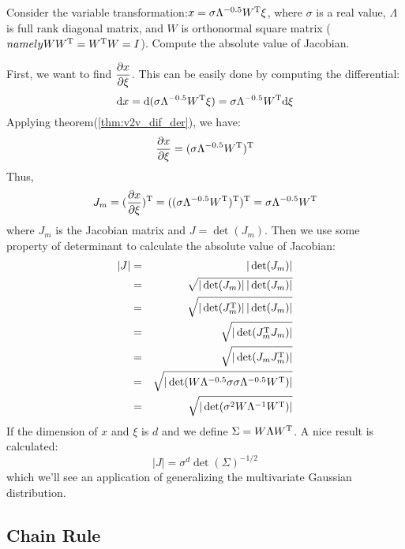 \begin{myex}
	\label{ex:gaussian_trans}
	Consider the variable transformation:$x = \sigma \Lambda^{-0.5}W^\mathrm{T} \xi$, 
	where $\sigma$ is a real value, $\Lambda$ is full rank diagonal matrix, 
	and $W$ is orthonormal square matrix
	($namely WW^\mathrm{T}=W^\mathrm{T}W = I$). Compute
	the absolute value of Jacobian.  
	
	First, we want to find $\dfrac{\partial x}{\partial \xi}$. This can be easily done 
	by computing the differential:
	\begin{equation}
		\mathrm{d}x = \mathrm{d}(\sigma \Lambda^{-0.5}W^\mathrm{T} \xi) 
		= \sigma \Lambda^{-0.5}W^\mathrm{T} \mathrm{d}\xi
	\end{equation}
	Applying theorem(\ref{thm:v2v_dif_der}), we have:
	\begin{equation}
		\dfrac{\partial x}{\partial \xi} = (\sigma \Lambda^{-0.5}W^\mathrm{T}) ^\mathrm{T}
	\end{equation}
	Thus, 
	\begin{equation}
		J_m = (\dfrac{\partial x}{\partial \xi}) ^\mathrm{T} = ((\sigma \Lambda^{-0.5}W^\mathrm{T}) ^\mathrm{T})^\mathrm{T}
		=\sigma \Lambda^{-0.5}W^\mathrm{T}
	\end{equation}
	where $J_m$ is the Jacobian matrix and $J= \det(J_m)$. Then we use 
	some property of determinant to calculate the absolute value of 
	Jacobian:
	\begin{eqnarray}
		|J| &=& |\det(J_m)| \\
		&=& \sqrt{|\det(J_m)|\,|\det(J_m)|} \\
		&=& \sqrt{|\det(J_m^\mathrm{T})|\,|\det(J_m)|} \\
		&=& \sqrt{|\det(J_m^\mathrm{T}J_m)|} \\
		&=& \sqrt{|\det(J_mJ_m^\mathrm{T})|} \\
		&=& \sqrt{|\det(   W \Lambda^{-0.5}\sigma \sigma \Lambda^{-0.5}W^\mathrm{T}  )|} \\
		&=& \sqrt{|\det( \sigma^2  W \Lambda^{-1}W^\mathrm{T}  )|}
	\end{eqnarray}
	If the dimension of $x$ and $\xi$ is $d$ and we define $\Sigma = W \Lambda W^\mathrm{T}$. 
	A nice result is calculated:
	\begin{equation}
		|J| = \sigma^d \det(\Sigma)^{-1/2}
	\end{equation}
	which we'll see an application of generalizing the multivariate Gaussian distribution. 
\end{myex}

\subsection{Chain Rule}

